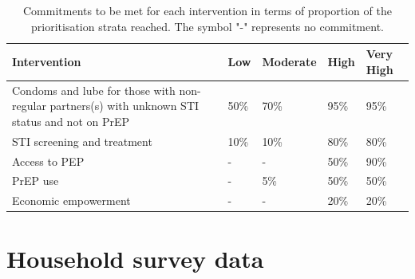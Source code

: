 \documentclass[a4paper, nobind]{templates/ociamthesis}
\begin{document}
\begin{table}[h]
\centering
\begin{tabularx}{\textwidth}{p{8cm}XXXX}
\toprule
Intervention & Low & Moderate & High & Very High \\
\midrule
Condoms and lube for those with non-regular partners(s) with unknown STI status and not on PrEP & 50\% & 70\% & 95\% & 95\% \\
STI screening and treatment & 10\% & 10\% & 80\% & 80\% \\
Access to PEP & - & - & 50\% & 90\% \\
PrEP use & - & 5\% & 50\% & 50\% \\
Economic empowerment & - & - & 20\% & 20\% \\
\bottomrule
\end{tabularx}
\caption{Commitments to be met for each intervention in terms of proportion of the prioritisation strata reached. The symbol "-" represents no commitment.}
\label{tab:unaids-strategy-targets}
\end{table}

\hypertarget{household-survey-data}{%
\section{Household survey data}\label{household-survey-data}}
\end{document}
